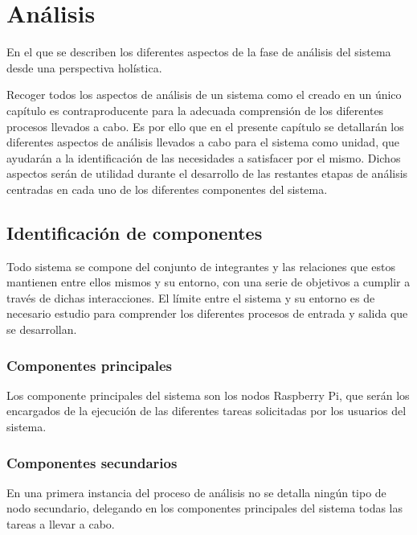 \chapter{Análisis}
\label{chapter:analisis}

\begin{cabstract}
En el que se describen los diferentes aspectos de la fase de análisis del sistema desde una perspectiva holística.
\end{cabstract}

Recoger todos los aspectos de análisis de un sistema como el creado en un único capítulo es contraproducente para la adecuada comprensión de los diferentes procesos llevados a cabo. Es por ello que en el presente capítulo se detallarán los diferentes aspectos de análisis llevados a cabo para el sistema como unidad, que ayudarán a la identificación de las necesidades a satisfacer por el mismo. Dichos aspectos serán de utilidad durante el desarrollo de las restantes etapas de análisis centradas en cada uno de los diferentes componentes del sistema.

\section{Identificación de componentes}

Todo sistema se compone del conjunto de integrantes y las relaciones que estos mantienen entre ellos mismos y su entorno, con una serie de objetivos a cumplir a través de dichas interacciones. El límite entre el sistema y su entorno es de necesario estudio para comprender los diferentes procesos de  entrada y salida que se desarrollan.

\subsection{Componentes principales} 

Los componente principales del sistema son los nodos Raspberry Pi, que serán los encargados de la ejecución de las diferentes tareas solicitadas por los usuarios del sistema.

\subsection{Componentes secundarios}

En una primera instancia del proceso de análisis no se detalla ningún tipo de nodo secundario, delegando en los componentes principales del sistema todas las tareas a llevar a cabo.

